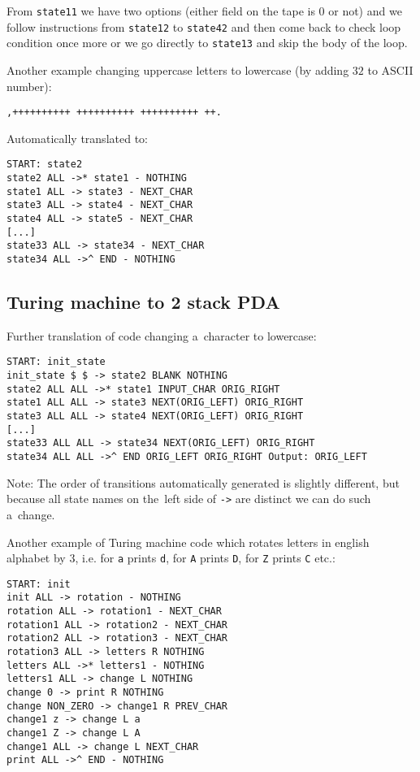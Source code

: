 \documentclass[english,shortabstract,mgr]{iithesis}
\begin{document}
From \texttt{state11} we have two options (either field on the tape is $0$
or not) and we follow instructions from \texttt{state12} to \texttt{state42}
and then come back to check loop condition once more or we go directly
to \texttt{state13} and skip the body of the loop.

Another example changing uppercase letters to lowercase (by adding $32$
to ASCII number):

\begin{verbatim}
,++++++++++ ++++++++++ ++++++++++ ++.
\end{verbatim}

Automatically translated to:

\begin{verbatim}
START: state2
state2 ALL ->* state1 - NOTHING
state1 ALL -> state3 - NEXT_CHAR
state3 ALL -> state4 - NEXT_CHAR
state4 ALL -> state5 - NEXT_CHAR
[...]
state33 ALL -> state34 - NEXT_CHAR
state34 ALL ->^ END - NOTHING
\end{verbatim}

\subsection{Turing machine to 2 stack PDA}

Further translation of code changing a~character to lowercase:

\begin{verbatim}
START: init_state
init_state $ $ -> state2 BLANK NOTHING
state2 ALL ALL ->* state1 INPUT_CHAR ORIG_RIGHT
state1 ALL ALL -> state3 NEXT(ORIG_LEFT) ORIG_RIGHT
state3 ALL ALL -> state4 NEXT(ORIG_LEFT) ORIG_RIGHT
[...]
state33 ALL ALL -> state34 NEXT(ORIG_LEFT) ORIG_RIGHT
state34 ALL ALL ->^ END ORIG_LEFT ORIG_RIGHT Output: ORIG_LEFT
\end{verbatim}

Note: The order of transitions automatically generated is slightly different,
but because all state names on the~left side of \texttt{->} are distinct
we can do such a~change.

Another example of Turing machine code which rotates letters in english
alphabet by $3$, i.e. for \texttt{a} prints \texttt{d}, for \texttt{A}
prints \texttt{D}, for \texttt{Z} prints \texttt{C} etc.:

\begin{verbatim}
START: init
init ALL -> rotation - NOTHING
rotation ALL -> rotation1 - NEXT_CHAR
rotation1 ALL -> rotation2 - NEXT_CHAR
rotation2 ALL -> rotation3 - NEXT_CHAR
rotation3 ALL -> letters R NOTHING
letters ALL ->* letters1 - NOTHING
letters1 ALL -> change L NOTHING
change 0 -> print R NOTHING
change NON_ZERO -> change1 R PREV_CHAR
change1 z -> change L a
change1 Z -> change L A
change1 ALL -> change L NEXT_CHAR
print ALL ->^ END - NOTHING
\end{verbatim}
\end{document}
